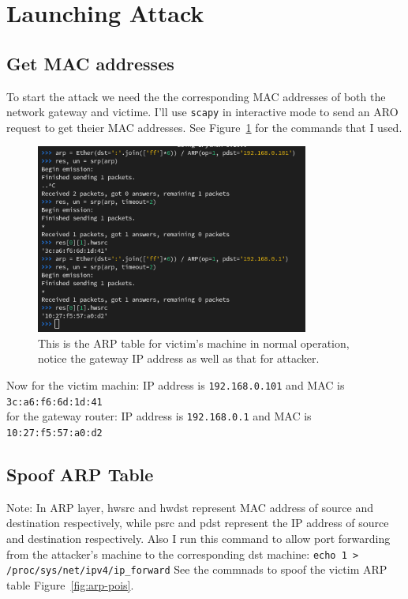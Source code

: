 \documentclass{article}
\def\c#1{\texttt{#1}}
\begin{document}
\section{Launching Attack}
\subsection{Get MAC addresses}
To start the attack we need the the corresponding MAC addresses of both the network gateway and victime. I'll use \c{scapy} in interactive mode to send an ARO request to get theier MAC addresses. See Figure~\ref{fig:get-mac} for the commands that I used.

\begin{figure}[ht]
	\centering
	\includegraphics[width=0.8\textwidth]{figures/cmds.png}
  \caption{This is the ARP table for victim's machine in normal operation, notice the gateway IP address as well as that for attacker.}
	\label{fig:get-mac}
\end{figure}

Now for the victim machin: IP address is \c{192.168.0.101} and MAC is \c{3c:a6:f6:6d:1d:41} \\
for the gateway router: IP address is \c{192.168.0.1} and MAC is \c{10:27:f5:57:a0:d2}

\subsection{Spoof ARP Table}

Note: In ARP layer, hwsrc and hwdst represent MAC address of source and destination respectively, while psrc and pdst represent the IP address of source and destination respectively.
Also I run this command to allow port forwarding from the attacker's machine to the corresponding  dst machine: \c{echo 1 > /proc/sys/net/ipv4/ip\_forward}
See the commnads to spoof the victim ARP table Figure~\ref{fig:arp-pois}.
\end{document}
